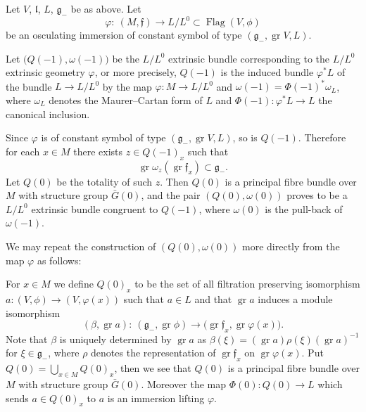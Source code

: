 \documentclass[pdftex]{sigma}%
\newcommand{\geneg}{\mathfrak g _-}
\newcommand{\f}{\mathfrak f}
\newcommand{\g}{\mathfrak g}
\newcommand{\lf}{\mathfrak l}
\newcommand{\Flag}{\operatorname{Flag}}
\newcommand{\gr}{\operatorname{gr}}
\numberwithin{equation}{section}
\begin{document}
Let $V$, $\lf$, $L$, $\geneg $ be as above. Let
\[
\varphi\colon\ (M, \f) \to L/L^0 \subset \Flag(V, \phi)
\]
be an osculating immersion of constant symbol of type $(\geneg, \gr V, L)$.

Let $\big(Q(-1), \omega (-1)\big)$ be the $L/L^0$ extrinsic bundle corresponding to
the $L/L^0$ extrinsic geo\-met\-ry $\varphi$, or more precisely, $Q(-1)$ is the induced bundle $\varphi^*L$ of the bundle $L \to L/L^0$
by the map $\varphi\colon M \to L/L^0$ and
$\omega(-1)= \Phi(-1)^*\omega_L$,
where $\omega_L$ denotes the Maurer--Cartan form of $L$ and
$\Phi(-1)\colon\varphi^*L \to L$ the canonical inclusion.

Since $\varphi$ is of constant symbol of type $(\geneg, \gr V, L)$, so is
$Q(-1)$. Therefore for each $x \in M$ there exists $z\in Q(-1)_x$ such that
\[
\gr \omega_z (\gr \f_x) \subset \g _-.
\]
Let $Q(0)$ be the totality of such $z $. Then $Q(0)$ is a principal fibre bundle over$M$ with structure group $\bar G(0) $, and the pair $(Q(0), \omega(0))$ proves to be a $L/L^0$ extrinsic bundle congruent to $Q(-1)$, where $\omega(0)$ is the pull-back of $\omega(-1)$.

We may repeat the construction of $ (Q(0), \omega(0))$
more directly from the map $\varphi $ as follows:

For $x \in M $ we define $Q(0)_x $ to be the set of all filtration preserving isomorphism $a\colon (V, \phi) \to (V, \varphi(x))$ such that $a \in L$ and that $\gr a $ induces a module isomorphism
\[
(\beta, \gr a)\colon\ (\geneg, \gr \phi) \to \big( \gr \f_x, \gr \varphi(x)\big).
\]
Note that $\beta$ is uniquely determined by $\gr a$
as $\beta (\xi) = (\gr a) \rho ( \xi) (\gr a) ^{-1}$ for $ \xi \in \geneg $, where $\rho$ denotes the representation of $\gr \f_x$ on $\gr \varphi(x)$. Put $Q(0) = \bigcup_{x \in M} Q(0)_x $, then we see that $Q(0)$ is a principal fibre bundle over $M$ with structure group $\bar{G}(0)$. Moreover the map $\Phi (0)\colon Q(0) \to L $ which sends $a \in Q(0)_x$ to $a$ is an immersion lifting $\varphi$.
\end{document}
